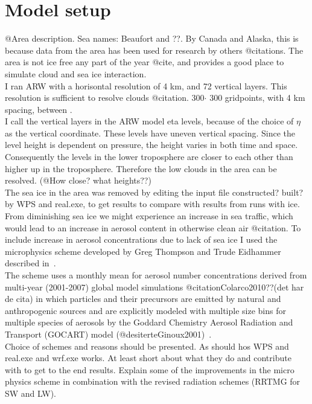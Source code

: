 \section{Model setup}
\label{sec:modelsetup}
@Area description. Sea names: Beaufort and ??. By Canada and Alaska, this is because data from the area has been used for research by others @citations. The area is not ice free any part of the year @cite, and provides a good place to simulate cloud and sea ice interaction.
\\
I ran ARW with a horisontal resolution of 4 km, and 72 vertical layers. This resolution is sufficient to resolve clouds @citation. 300$\cdot$ 300 gridpoints, with 4 km spacing, between .
\\
I call the vertical layers in the ARW model eta levels, because of the choice of $\eta$ as the vertical coordinate. These levels have uneven vertical spacing. Since the level height is dependent on pressure, the height varies in both time and space. Consequently the levels in the lower troposphere are closer to each other than higher up in the troposphere. Therefore the low clouds in the area can be resolved. (@How close? what heights??)
\\
The sea ice in the area was removed by editing the input file constructed? built? by WPS and real.exe, to get results to compare with results from runs with ice.
\\
From diminishing sea ice we might experience an increase in sea traffic, which would lead to an increase in aerosol content in otherwise clean air @citation. To include increase in aerosol concentrations due to lack of sea ice I used the microphysics scheme developed by Greg Thompson and Trude Eidhammer described in~\cite{Thompson2014}.
\\
The scheme uses a monthly mean for aerosol number concentrations derived from multi-year (2001-2007) global model simulations @citationColarco2010??(det har de cita) in which particles and their precursors are emitted by natural and anthropogenic sources and are explicitly modeled with multiple size bins for multiple species of aerosols by the Goddard Chemistry Aerosol Radiation and Transport (GOCART) model (@desiterteGinoux2001)~\citep{Thompson2014}.
\\
Choice of schemes and reasons should be presented. As should hos WPS and real.exe and wrf.exe works. At least short about what they do and contribute with to get to the end results. Explain some of the improvements in the micro physics scheme in combination with the revised radiation schemes (RRTMG for SW and LW).

